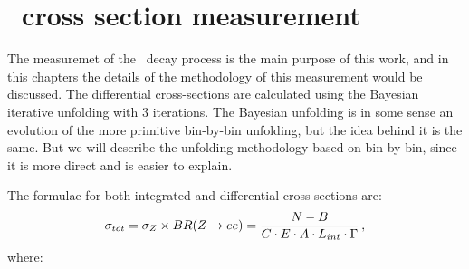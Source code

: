 \chapter{\Zee\ cross section measurement}
\label{sec:ZeeCrossSec}

The measuremet of the \Zee\ decay process is the main purpose of this work, and in this chapters the details of the methodology of this measurement would be discussed. The differential cross-sections are calculated using the Bayesian iterative unfolding with 3 iterations. The Bayesian unfolding is in some sense an evolution of the more primitive bin-by-bin unfolding, but the idea behind it is the same. But we will describe the unfolding methodology based on bin-by-bin, since it is more direct and is easier to explain.

The formulae for both integrated and differential cross-sections are:
\begin{equation}
\sigma_{tot} = \sigma_{Z} \times BR(Z \rightarrow ee) = \frac{N - B}{C \cdot E \cdot A \cdot L_{int}  \cdot \Gamma}\,,
\end{equation}
where:
